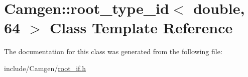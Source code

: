 \hypertarget{a00484}{}\section{Camgen\+:\+:root\+\_\+type\+\_\+id$<$ double, 64 $>$ Class Template Reference}
\label{a00484}


The documentation for this class was generated from the following file\+:\begin{DoxyCompactItemize}
\item 
include/\+Camgen/\hyperlink{a00760}{root\+\_\+if.\+h}\end{DoxyCompactItemize}
